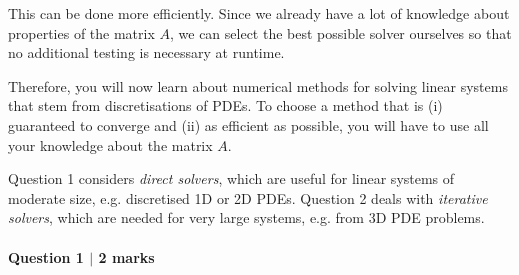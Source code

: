 This can be done more efficiently. Since we already have a lot of knowledge about properties of the matrix $A$, we can select the best possible solver ourselves so that no additional testing is necessary at runtime.

Therefore, you will now learn about numerical methods for solving linear systems that stem from discretisations of PDEs. To choose a method that is (i) guaranteed to converge and (ii) as efficient as possible, you will have to use all your knowledge about the matrix $A$.

Question 1 considers \emph{direct solvers}, which are useful for linear systems of moderate size, e.g. discretised 1D or 2D PDEs. Question 2 deals with \emph{iterative solvers}, which are needed for very large systems, e.g. from 3D PDE problems.

\paragraph*{Question 1 $\vert$ 2 marks}%

